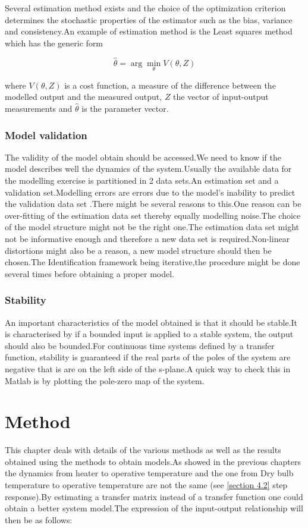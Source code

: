\documentclass[a4paper,12pt]{report}
\numberwithin{equation}{section}
\begin{document}
Several estimation method exists and the choice of the optimization criterion determines the stochastic properties of the estimator such as the bias, variance and consistency.An example of estimation method is the Least squares method which has the generic form

\begin{equation}
\hat{\theta}=\arg  \min _{\theta} V(\theta, Z)
\end{equation}


\noindent
where $V(\theta, Z)$ is a cost function, a  measure of the difference between the modelled output and the measured output, $Z$ the vector of input-output measurements and $\hat{\theta}$ is the parameter vector.

\subsection{Model validation}
The validity of the model obtain should be accessed.We need to know if the model describes well the dynamics of the system.Usually the available data for the modelling exercise is partitioned in 2 data sets.An estimation set and a validation set.Modelling errors are errors due to the model's inability  to predict the  validation data set .There might be several reasons to this.One reason can be over-fitting of the estimation data set thereby equally modelling noise.The choice of the model structure might not be the right one.The estimation data set might not be informative enough and therefore a new data set is required.Non-linear distortions might also be a reason, a new model structure should then be chosen.The Identification framework being iterative,the procedure might be done several times before obtaining a proper model. 

\subsection*{Stability}
An important characteristics of the model obtained is that it should be stable.It is characterised by if a bounded input is applied to a stable system, the output should also be bounded.For continuous time systems defined by a transfer function, stability is guaranteed if the real parts of the poles of the system are negative that is are on the left side of the s-plane.A quick way to check this in Matlab is by plotting the pole-zero map of the system.


\newpage
\chapter{Method}
This chapter deals with details of the various methods as well as the results obtained using the methods to obtain models.As showed in the previous chapters the dynamics from heater to operative temperature and the one from Dry bulb temperature to operative temperature are not the same (see \ref{section 4.2} step response).By estimating  a transfer matrix instead of a transfer function one could obtain a better system model.The expression of the input-output relationship will then be as follows:
\end{document}

